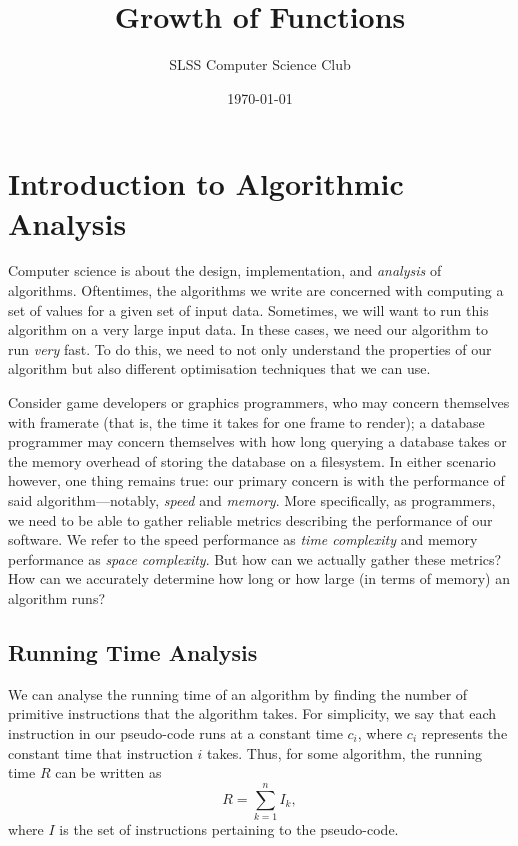 \documentclass{cslesson}
\title{Growth of Functions}
\author{SLSS Computer Science Club}
\date{\today}
\numberwithin{equation}{section}
\begin{document}
\maketitle

\section{Introduction to Algorithmic Analysis}
Computer science is about the design, implementation, and \textit{analysis} of algorithms. Oftentimes, the algorithms we write are concerned with computing a set of values for a given set of input data. Sometimes, we will want to run this algorithm on a very large input data. In these cases, we need our algorithm to run \textit{very} fast. To do this, we need to not only understand the properties of our algorithm but also different optimisation techniques that we can use.

Consider game developers or graphics programmers, who may concern themselves with framerate (that is, the time it takes for one frame to render); a database programmer may concern themselves with how long querying a database takes or the memory overhead of storing the database on a filesystem. In either scenario however, one thing remains true: our primary concern is with the performance of said algorithm---notably, \textit{speed} and \textit{memory}. More specifically, as programmers, we need to be able to gather reliable metrics describing the performance of our software. We refer to the speed performance as \textit{time complexity} and memory performance as \textit{space complexity}. But how can we actually gather these metrics? How can we accurately determine how long or how large (in terms of memory) an algorithm runs?

\subsection{Running Time Analysis}

We can analyse the running time of an algorithm by finding the number of primitive instructions that the algorithm takes. For simplicity, we say that each instruction in our pseudo-code runs at a constant time $c_i$, where $c_i$ represents the constant time that instruction $i$ takes. Thus, for some algorithm, the running time $R$ can be written as
\begin{equation}
    R=\sum^n_{k=1}I_k,
\end{equation}
where $I$ is the set of instructions pertaining to the pseudo-code.
\end{document}
